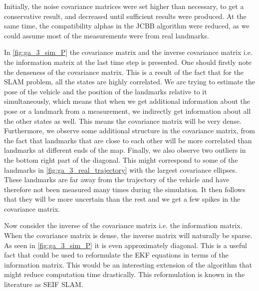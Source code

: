 Initially, the noise covariance matrices were set higher than necessary, to get a conservative result, and decreased until sufficient results were produced. At the same time, the compatibility alphas in the JCBB algorithm were reduced, as we could assume most of the measurements were from real landmarks.



In \cref{fig:ga_3_sim_P} the covariance matrix and the inverse covariance matrix i.e. the information matrix at the last time step is presented. One should firstly note the denseness of the covariance matrix. This is a result of the fact that for the SLAM problem, all the states are highly correlated. We are trying to estimate the pose of the vehicle and the position of the landmarks relative to it simultaneously, which means that when we get additional information about the pose or a landmark from a measurement, we indirectly get information about all the other states as well. This means the covariance matrix will be very dense. Furthermore, we observe some additional structure in the covariance matrix, from the fact that landmarks that are close to each other will be more correlated than landmarks at different ends of the map. Finally, we also observe two outliers in the bottom right part of the diagonal. This might correspond to some of the landmarks in \cref{fig:ga_3_real_trajectory} with the largest covariance ellipses. These landmarks are far away from the trajectory of the vehicle and have therefore not been measured many times during the simulation. It then follows that they will be more uncertain than the rest and we get a few spikes in the covariance matrix.

Now consider the inverse of the covariance matrix i.e. the information matrix. When the covariance matrix is dense, the inverse matrix will naturally be sparse. As seen in \cref{fig:ga_3_sim_P} it is even approximately diagonal. This is a useful fact that could be used to reformulate the EKF equations in terms of the information matrix. This would be an interesting extension of the algorithm that might reduce computation time drastically. This reformulation is known in the literature as SEIF SLAM. 

